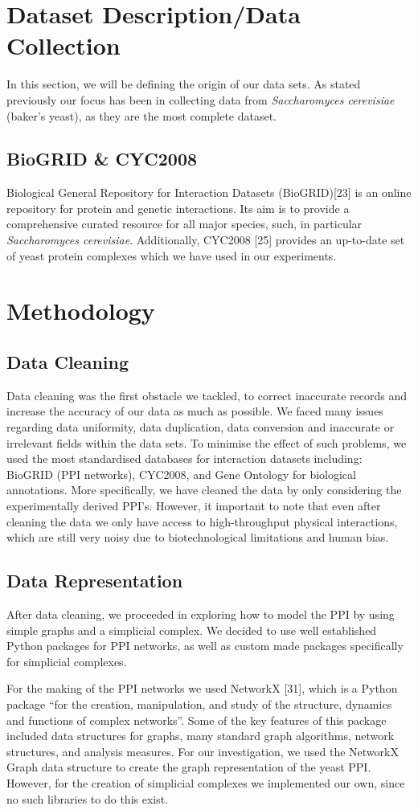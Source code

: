 \documentclass[9pt]{article}
\begin{document}
\section{Dataset Description/Data Collection}
In this section, we will be defining the origin of our data sets. As stated previously our focus has been in collecting data from \textit{Saccharomyces cerevisiae} (baker’s yeast), as they are the most complete dataset.

\subsection{BioGRID \& CYC2008}
Biological General Repository for Interaction Datasets (BioGRID)[23] is an online repository for protein and genetic interactions. Its aim is to provide a comprehensive curated resource for all major species, such, in particular \textit{Saccharomyces cerevisiae}. Additionally, CYC2008 [25] provides an up-to-date set of yeast protein complexes which we have used in our experiments.

\section{Methodology}
\subsection{Data Cleaning}
Data cleaning was the first obstacle we tackled, to correct inaccurate records and increase the accuracy of our data as much as possible. We faced many issues regarding data uniformity, data duplication, data conversion and inaccurate or irrelevant fields within the data sets. To minimise the effect of such problems, we used the most standardised databases for interaction datasets including: BioGRID (PPI networks), CYC2008, and Gene Ontology for biological annotations. More specifically, we have cleaned the data by only considering the experimentally derived PPI’s. However, it important to note that even after cleaning the data we only have access to high-throughput physical interactions, which are still very noisy due to biotechnological limitations and human bias.

\subsection{Data Representation}
After data cleaning, we proceeded in exploring how to model the PPI by using simple graphs and a simplicial complex. We decided to use well established Python packages for PPI networks, as well as custom made packages specifically for simplicial complexes.
\par
For the making of the PPI networks we used NetworkX [31], which is a Python package “for the creation, manipulation, and study of the structure, dynamics and functions of complex networks”. Some of the key features of this package included data structures for graphs, many standard graph algorithms, network structures, and analysis measures. For our investigation, we used the NetworkX Graph data structure to create the graph representation of the yeast PPI.  However, for the creation of simplicial complexes we implemented our own, since no such libraries to do this exist. 
\end{document}
